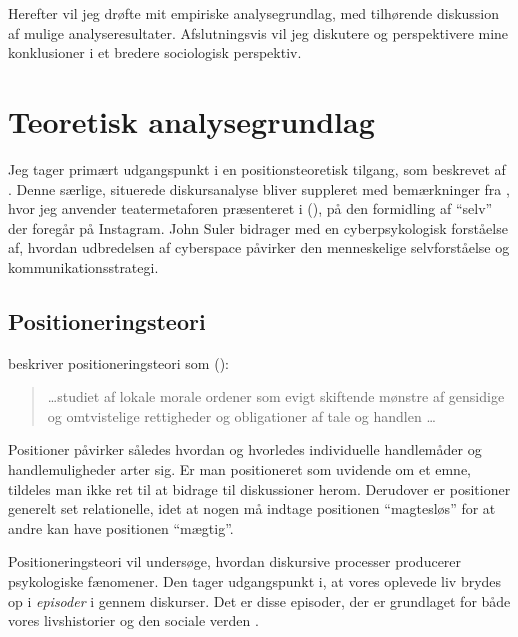 Herefter vil jeg drøfte mit empiriske analysegrundlag, med
tilhørende diskussion af mulige analyseresultater. Afslutningsvis
vil jeg diskutere og perspektivere mine konklusioner i et bredere
sociologisk perspektiv.

\section{Teoretisk analysegrundlag}

Jeg tager primært udgangspunkt i en positionsteoretisk tilgang, 
som beskrevet af \citeauthor{harrePositioningTheoryMoral1999}.   
Denne særlige, situerede diskursanalyse 
\autocite{harreRecentAdvancesPositioning2009} bliver suppleret med
bemærkninger fra 
\citeauthor{goffmanPresentationSelfEveryday1956}, hvor jeg 
anvender teatermetaforen præsenteret i 
(\citeyear{goffmanPresentationSelfEveryday1956}), på den 
formidling af “selv” der foregår på Instagram.  John Suler
bidrager med en cyberpsykologisk forståelse af, hvordan 
udbredelsen af cyberspace påvirker den menneskelige selvforståelse
og kommunikationsstrategi.

\subsection{Positioneringsteori}

\citeauthor{harrePositioningTheoryMoral1999} beskriver 
positioneringsteori som (\citeyear[s. 1, min oversættelse
]{harrePositioningTheoryMoral1999}):
\begin{quotation}
  \ldots studiet af lokale morale ordener som evigt skiftende 
  mønstre af gensidige og omtvistelige rettigheder og 
  obligationer af tale og handlen \ldots
\end{quotation}

Positioner påvirker således hvordan og hvorledes individuelle 
handlemåder og handlemuligheder arter sig. Er man positioneret som
uvidende om et emne, tildeles man ikke ret til at bidrage til 
diskussioner herom. Derudover er positioner generelt set
relationelle, idet at nogen må indtage positionen “magtesløs” for 
at andre kan have positionen “mægtig”.

Positioneringsteori vil undersøge, hvordan diskursive processer 
producerer psykologiske fænomener. Den tager udgangspunkt i, at 
vores oplevede liv brydes op i \emph{episoder} i gennem diskurser.  
Det er disse episoder, der er grundlaget for både vores
livshistorier og den sociale verden \autocite[s. 
4]{harrePositioningTheoryMoral1999}.

